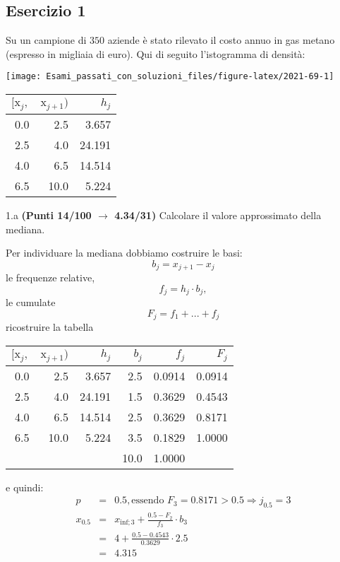 \documentclass[
  11pt,
]{book}
\theoremstyle{mytheoremstyle}
\theoremstyle{mydefstyle}
\newenvironment{sol}
  {
  \begin{tcolorbox}[enhanced,breakable,arc=0.1mm,boxrule=1pt,colback=white,colframe=iblue,
  title=\bf \fontfamily{lmss}\selectfont \hspace{.5 cm} Soluzione,drop fuzzy shadow]

}{
\end{tcolorbox}
  }
\begin{document}
\subsection{Esercizio 1}\label{esercizio-1-8}

Su un campione di \(350\) aziende è stato rilevato il costo annuo in gas metano (espresso in migliaia di euro). Qui di seguito l'istogramma di densità:

\begin{center}\texttt{[image: Esami\_passati\_con\_soluzioni\_files/figure-latex/2021-69-1]} \end{center}

\begin{table}[H]
\centering
\begin{tabular}{rrr}
\toprule
$[\text{x}_j,$ & $\text{x}_{j+1})$ & $h_j$\\
\midrule
0.0 & 2.5 & 3.657\\
2.5 & 4.0 & 24.191\\
4.0 & 6.5 & 14.514\\
6.5 & 10.0 & 5.224\\
\bottomrule
\end{tabular}
\end{table}

1.a \textbf{(Punti 14/100 \(\rightarrow\) 4.34/31)} Calcolare il valore approssimato della mediana.

\begin{sol}

Per individuare la mediana dobbiamo costruire le basi:
\[
b_j=x_{j+1}-x_{j}
\]
le frequenze relative,
\[
f_j=h_j\cdot b_j,
\]
le cumulate
\[
F_j=f_1+...+f_j
\]
ricostruire la tabella

\begin{table}[H]
\centering
\begin{tabular}{rrrrrr}
\toprule
$[\text{x}_j,$ & $\text{x}_{j+1})$ & $h_j$ & $b_j$ & $f_j$ & $F_j$\\
\midrule
0.0 & 2.5 & 3.657 & 2.5 & 0.0914 & 0.0914\\
2.5 & 4.0 & 24.191 & 1.5 & 0.3629 & 0.4543\\
4.0 & 6.5 & 14.514 & 2.5 & 0.3629 & 0.8171\\
6.5 & 10.0 & 5.224 & 3.5 & 0.1829 & 1.0000\\
 &  &  & 10.0 & 1.0000 & \\
\bottomrule
\end{tabular}
\end{table}

e quindi:
\begin{eqnarray*}
  p &=&  0.5 , \text{essendo }F_{ 3 }= 0.8171  > 0.5  \Rightarrow j_{ 0.5 }= 3 \\
  x_{ 0.5 } &=& x_{\text{inf}; 3 } + \frac{ { 0.5 } - F_{ 2 }} {f_{ 3 }} \cdot b_{ 3 } \\
            &=&  4  + \frac {{ 0.5 } -  0.4543 } { 0.3629 } \cdot  2.5  \\
            &=&  4.315 
\end{eqnarray*}

\end{sol}
\end{document}
